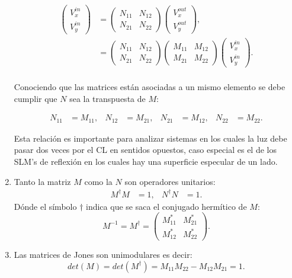 \begin{enumerate}
 \begin{align*}
    \begin{pmatrix}
      V_x^{in}\\V_y^{in}
    \end{pmatrix}
    &=
    \begin{pmatrix}
      N_{11}&N_{12}\\N_{21} & N_{22}
    \end{pmatrix}
    \begin{pmatrix}
      V_x^{out}\\V_y^{out}
    \end{pmatrix},\\
    &=
    \begin{pmatrix}
      N_{11}&N_{12}\\N_{21} & N_{22}
    \end{pmatrix}
    \begin{pmatrix}
      M_{11}&M_{12}\\M_{21} & M_{22}
    \end{pmatrix}
    \begin{pmatrix}
      V_x^{in}\\V_y^{in}
    \end{pmatrix}.\\
  \end{align*}

  Conociendo que las matrices están asociadas a un mismo elemento se
  debe cumplir que $N$ sea la transpuesta de $M$:

  \begin{align*}
    N_{11}&=M_{11},&    N_{12}&=M_{21},&     N_{21}&=M_{12}, &     N_{22}&=M_{22}.
  \end{align*}

Esta relación es importante para analizar sistemas en los cuales la
luz debe pasar dos veces por el CL en sentidos opuestos, caso especial
es el de los SLM's de reflexión en los cuales hay una
superficie especular de un lado.

\item Tanto la matriz $M$ como la $N$ son operadores unitarios:
  \begin{align*}
    M^{\dagger} M &= 1,& N^{\dagger}N &=1.
  \end{align*}
Dónde el símbolo $\dagger$ indica que se saca el conjugado hermítico
de $M$:
\begin{equation*}
M^{-1}=M^{\dagger}=
  \begin{pmatrix}
      M_{11}^*&M_{21}^*\\M_{12}^* & M_{22}^*
    \end{pmatrix}.
\end{equation*}
\item Las matrices de Jones son unimodulares es decir:
$$det(M) = det(M^{\dagger})  = M_{11}M_{22}-M_{12}M_{21} = 1.$$ 


\end{enumerate}
